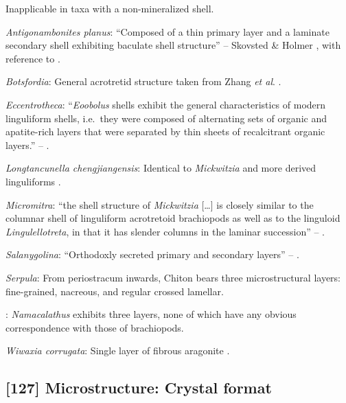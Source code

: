 \documentclass[openany]{book}
\theoremstyle{definition}
\theoremstyle{definition}
\theoremstyle{definition}
\theoremstyle{remark}
\begin{document}
Inapplicable in taxa with a non-mineralized shell.

\hypertarget{Antigonambonites_planus-coding-126}{}
\emph{Antigonambonites planus}: ``Composed of a thin primary layer and a
laminate secondary shell exhibiting baculate shell structure'' --
Skovsted \& Holmer \citeyearpar{Skovsted2005EarlyCambrian}, with
reference to \citet{Skovsted2003EarlyCambrian}.

\hypertarget{Botsfordia-coding-126}{}
\emph{Botsfordia}: General acrotretid structure taken from Zhang
\emph{et al}. \citeyearpar{Zhang2016Epithelialcell}.

\hypertarget{Eccentrotheca-coding-126}{}
\emph{Eccentrotheca}: ``\emph{Eoobolus} shells exhibit the general
characteristics of modern linguliform shells, i.e.~they were composed of
alternating sets of organic and apatite-rich layers that were separated
by thin sheets of recalcitrant organic layers.'' --
\citet{Balthasar2007Anearly}.

\hypertarget{Longtancunella_chengjiangensis-coding-126}{}
\emph{Longtancunella chengjiangensis}: Identical to \emph{Mickwitzia}
and more derived linguliforms \citep{Holmer2011Firstrecord}.

\hypertarget{Micromitra-coding-126}{}
\emph{Micromitra}: ``the shell structure of \emph{Mickwitzia}
{[}\ldots{}{]} is closely similar to the columnar shell of linguliform
acrotretoid brachiopods as well as to the linguloid
\emph{Lingulellotreta}, in that it has slender columns in the laminar
succession'' -- \citet{Williams2007Supplement}.

\hypertarget{Salanygolina-coding-126}{}
\emph{Salanygolina}: ``Orthodoxly secreted primary and secondary
layers'' -- \citet{Williams2004Chemicostructure}.

\hypertarget{Serpula-coding-126}{}
\emph{Serpula}: From periostracum inwards, Chiton bears three
microstructural layers: fine-grained, nacreous, and regular crossed
lamellar.

\hypertarget{TAXLABELS-coding-126}{}
: \emph{Namacalathus} exhibits three layers, none of which have any
obvious correspondence with those of brachiopods.

\hypertarget{Wiwaxia_corrugata-coding-126}{}
\emph{Wiwaxia corrugata}: Single layer of fibrous aragonite
\citep{Porter2008}.

\subsection*{{[}127{]} Microstructure: Crystal
format}\label{microstructure-crystal-format}
\end{document}
